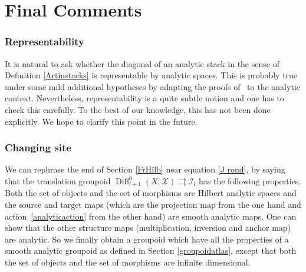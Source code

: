 \documentclass[JEP,XML,SOM,Unicode]{cedram}
\let\mathcal\mathscr
\DeclareMathOperator{\Diff}{Diff}
\theoremstyle{plain}
\theoremstyle{definition}
\theoremstyle{remark}
\numberwithin{equation}{section}
\newcommand{\cI}{\mathcal{I}}
\begin{document}
\section{Final Comments}
\label{secfinalcomments}
\subsubsection*{Representability} It is natural to ask whether the diagonal of an analytic stack in the sense of Definition \ref{Artinstacks} is representable by analytic spaces. This is probably true under some mild additional hypotheses by adapting the proofs of~\cite[Props.\,15.5\,\&\,15.18]{BCEFFGK} to the analytic context. Nevertheless, representability is a quite subtle notion and one has to check this carefully. To the best of our knowledge, this has not been done explicitly. We hope to clarify this point in the future.

\subsubsection*{Changing site} We can rephrase the end of Section \ref{FrHilb} near equation \eqref{J rond}, by saying that the translation groupoid $\Diff^0_{l+1} (X,\mathcal X)\rightrightarrows \cI_l$ has the following properties. Both the set of objects and the set of morphisms are Hilbert analytic spaces and the source and target maps (which are the projection map from the one hand and action~\eqref{analyticaction} from the other hand) are smooth analytic maps. One can show that the other structure maps (multiplication, inversion and anchor map) are analytic. So we finally obtain a groupoid which have all the properties of a smooth analytic groupoid as defined in Section \ref{groupoidatlas}, except that both the set of objects and the set of morphisms are infinite dimensional.
\end{document}
